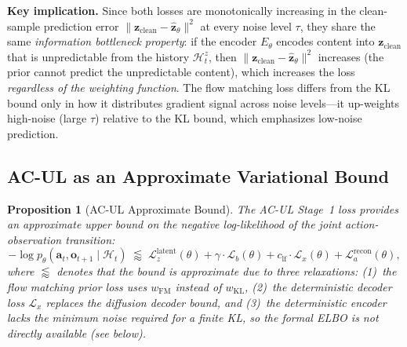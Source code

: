 \documentclass{article}
\newtheorem{proposition}{Proposition}
\newcommand{\vo}{\bm{o}}
\newcommand{\vz}{\bm{z}}
\newcommand{\va}{\bm{a}}
\newcommand{\KL}{\mathrm{KL}}
\newcommand{\loss}{\mathcal{L}}
\begin{document}
\textbf{Key implication.}
Since both losses are monotonically increasing in the clean-sample prediction error $\|\vz_{\text{clean}} - \hat{\vz}_\theta\|^2$ at every noise level $\tau$, they share the same \emph{information bottleneck property}: if the encoder $E_\theta$ encodes content into $\vz_{\text{clean}}$ that is unpredictable from the history $\mathcal{H}_t^z$, then $\|\vz_{\text{clean}} - \hat{\vz}_\theta\|^2$ increases (the prior cannot predict the unpredictable content), which increases the loss \emph{regardless of the weighting function}.
The flow matching loss differs from the KL bound only in how it distributes gradient signal across noise levels---it up-weights high-noise (large $\tau$) relative to the KL bound, which emphasizes low-noise prediction.

\subsection{AC-UL as an Approximate Variational Bound}

\begin{proposition}[AC-UL Approximate Bound]
The AC-UL Stage~1 loss provides an approximate upper bound on the negative log-likelihood of the joint action-observation transition:
\begin{equation}
  -\log p_\theta(\va_t, \vo_{t+1} \mid \mathcal{H}_t) \;\lessapprox\; \loss_z^{\text{latent}}(\theta) + \gamma \cdot \loss_b(\theta) + c_{\text{lf}} \cdot \loss_x(\theta) + \loss_a^{\text{recon}}(\theta),
  \label{eq:acul_bound}
\end{equation}
where $\lessapprox$ denotes that the bound is approximate due to three relaxations: (1)~the flow matching prior loss uses $w_{\text{FM}}$ instead of $w_{\KL}$, (2)~the deterministic decoder loss $\loss_x$ replaces the diffusion decoder bound, and (3)~the deterministic encoder lacks the minimum noise required for a finite KL, so the formal ELBO is not directly available (see below).
\end{proposition}
\end{document}
